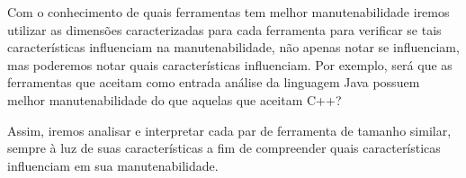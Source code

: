 Com o conhecimento de quais ferramentas tem melhor manutenabilidade iremos
utilizar as dimensões caracterizadas para cada ferramenta para verificar se
tais características influenciam na manutenabilidade, não apenas notar se
influenciam, mas poderemos notar quais características influenciam. Por
exemplo, será que as ferramentas que aceitam como entrada análise da linguagem
Java possuem melhor manutenabilidade do que aquelas que aceitam C++?

Assim, iremos analisar e interpretar cada par de ferramenta de tamanho
similar, sempre à luz de suas características a fim de compreender quais
características influenciam em sua manutenabilidade.

%
%

